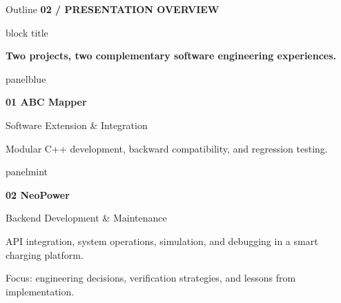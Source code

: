 \documentclass[aspectratio=169,10pt]{beamer}
\newcommand{\smalllabel}[1]{{\scriptsize\bfseries\color{Accent}\MakeUppercase{#1}}}
\newcommand{\takeaway}[1]{%
  \begin{beamercolorbox}[rounded=true,sep=0.15cm,wd=\linewidth]{block title}%
    \strut\textbf{#1}\strut
  \end{beamercolorbox}%
}
\newcommand{\outlinecard}[4]{%
  \begin{beamercolorbox}[rounded=true,sep=0.17cm,wd=\linewidth]{#1}%
    \begin{minipage}[c]{0.34\linewidth}
      {\normalsize\bfseries #2}\par\vspace{0.03cm}
      {\scriptsize\color{Accent}#3}
    \end{minipage}\hfill%
    \begin{minipage}[c]{0.63\linewidth}
      {\small #4}
    \end{minipage}%
  \end{beamercolorbox}%
}
\begin{document}
\begin{frame}{Outline}
  \vspace{0.04cm}
  \smalllabel{02 / Presentation Overview}\par
  \vspace{0.09cm}
  \takeaway{Two projects, two complementary software engineering experiences.}
  \vspace{0.25cm}
  \outlinecard{panelblue}{01 \quad ABC Mapper}{Software Extension \& Integration}{%
    Modular C++ development, backward compatibility, and regression testing.}
  \vspace{0.17cm}
  \outlinecard{panelmint}{02 \quad NeoPower}{Backend Development \& Maintenance}{%
    API integration, system operations, simulation, and debugging in a smart charging platform.}

  \vfill
  {\scriptsize\color{Muted}Focus: engineering decisions, verification strategies, and lessons from implementation.}
\end{frame}
\end{document}
